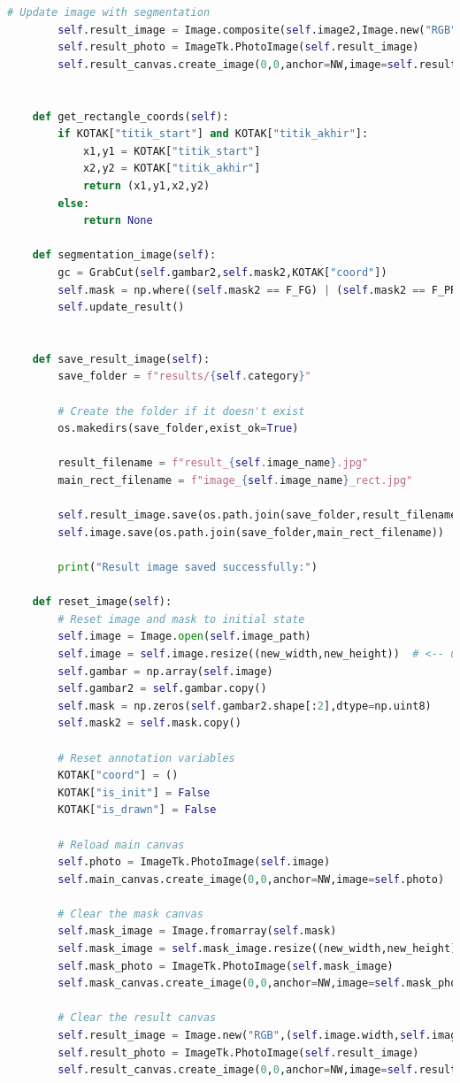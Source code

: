 \begin{lstlisting}[language=Python,basicstyle=\tiny]
        # Update image with segmentation
        self.result_image = Image.composite(self.image2,Image.new("RGB",self.image.size,"black"),self.mask_image)
        self.result_photo = ImageTk.PhotoImage(self.result_image)
        self.result_canvas.create_image(0,0,anchor=NW,image=self.result_photo)
   

    def get_rectangle_coords(self):
        if KOTAK["titik_start"] and KOTAK["titik_akhir"]:
            x1,y1 = KOTAK["titik_start"]
            x2,y2 = KOTAK["titik_akhir"]
            return (x1,y1,x2,y2)
        else:
            return None

    def segmentation_image(self):
        gc = GrabCut(self.gambar2,self.mask2,KOTAK["coord"])
        self.mask = np.where((self.mask2 == F_FG) | (self.mask2 == F_PR_FG),255,0).astype('uint8')
        self.update_result()


    def save_result_image(self):
        save_folder = f"results/{self.category}"

        # Create the folder if it doesn't exist
        os.makedirs(save_folder,exist_ok=True)

        result_filename = f"result_{self.image_name}.jpg"
        main_rect_filename = f"image_{self.image_name}_rect.jpg"

        self.result_image.save(os.path.join(save_folder,result_filename))
        self.image.save(os.path.join(save_folder,main_rect_filename))

        print("Result image saved successfully:")

    def reset_image(self):
        # Reset image and mask to initial state
        self.image = Image.open(self.image_path)
        self.image = self.image.resize((new_width,new_height))  # <-- untuk resize ukuran
        self.gambar = np.array(self.image)
        self.gambar2 = self.gambar.copy()
        self.mask = np.zeros(self.gambar2.shape[:2],dtype=np.uint8)
        self.mask2 = self.mask.copy()

        # Reset annotation variables
        KOTAK["coord"] = ()
        KOTAK["is_init"] = False
        KOTAK["is_drawn"] = False

        # Reload main canvas
        self.photo = ImageTk.PhotoImage(self.image)
        self.main_canvas.create_image(0,0,anchor=NW,image=self.photo)

        # Clear the mask canvas
        self.mask_image = Image.fromarray(self.mask)
        self.mask_image = self.mask_image.resize((new_width,new_height)) # <-- untuk resize ukuran
        self.mask_photo = ImageTk.PhotoImage(self.mask_image)
        self.mask_canvas.create_image(0,0,anchor=NW,image=self.mask_photo)

        # Clear the result canvas
        self.result_image = Image.new("RGB",(self.image.width,self.image.height))
        self.result_photo = ImageTk.PhotoImage(self.result_image)
        self.result_canvas.create_image(0,0,anchor=NW,image=self.result_photo)

\end{lstlisting}

